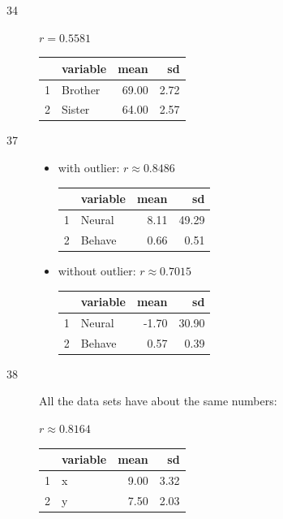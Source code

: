 \documentclass[letterpaper, landscape]{exam}
\begin{document}
    \begin{description}
      \item[34] $r = 0.5581$

        \begin{tabular}{rlrr}
          \toprule
            & variable & mean & sd \\
          \midrule
          1 & Brother & 69.00 & 2.72 \\
          2 & Sister  & 64.00 & 2.57 \\
          \bottomrule
        \end{tabular}

      \item[37]
        \begin{itemize}
          \item with outlier: $r \approx 0.8486$

            \begin{tabular}{rlrr}
              \toprule
                & variable & mean & sd \\
              \midrule
              1 & Neural   & 8.11 & 49.29 \\
              2 & Behave   & 0.66 & 0.51 \\
              \bottomrule
            \end{tabular}

          \item without outlier: $r \approx 0.7015$

            \begin{tabular}{rlrr}
              \toprule
                 & variable & mean  & sd \\
              \midrule
              1  & Neural   & -1.70 & 30.90 \\
              2  & Behave   & 0.57  & 0.39 \\
              \bottomrule
            \end{tabular}

        \end{itemize}

      \item[38]
        All the data sets have about the same numbers:

        $r \approx 0.8164$

        \begin{tabular}{rlrr}
          \toprule
             & variable & mean & sd \\
          \midrule
          1  & x        & 9.00 & 3.32 \\
          2  & y        & 7.50 & 2.03 \\
          \bottomrule
        \end{tabular}


\end{description}
\end{document}
